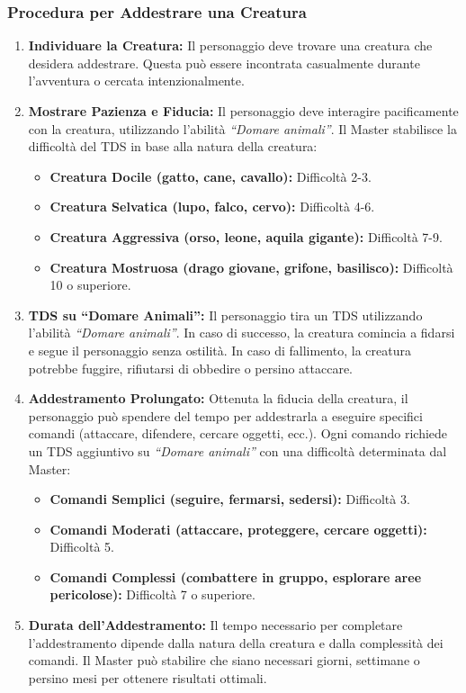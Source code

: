 \documentclass[../manuale_main.tex]{subfiles}
\begin{document}
\subsubsection{Procedura per Addestrare una Creatura}
\begin{enumerate}
    \item \textbf{Individuare la Creatura:} Il personaggio deve trovare una creatura che desidera addestrare. Questa può essere incontrata casualmente durante l'avventura o cercata intenzionalmente.
    
    \item \textbf{Mostrare Pazienza e Fiducia:} Il personaggio deve interagire pacificamente con la creatura, utilizzando l'abilità \emph{``Domare animali''}. Il Master stabilisce la difficoltà del TDS in base alla natura della creatura:
    \begin{itemize}
        \item \textbf{Creatura Docile (gatto, cane, cavallo):} Difficoltà 2-3.
        \item \textbf{Creatura Selvatica (lupo, falco, cervo):} Difficoltà 4-6.
        \item \textbf{Creatura Aggressiva (orso, leone, aquila gigante):} Difficoltà 7-9.
        \item \textbf{Creatura Mostruosa (drago giovane, grifone, basilisco):} Difficoltà 10 o superiore.
    \end{itemize}
    
    \item \textbf{TDS su ``Domare Animali'':} Il personaggio tira un TDS utilizzando l'abilità \emph{``Domare animali''}. In caso di successo, la creatura comincia a fidarsi e segue il personaggio senza ostilità. In caso di fallimento, la creatura potrebbe fuggire, rifiutarsi di obbedire o persino attaccare.
    
    \item \textbf{Addestramento Prolungato:} Ottenuta la fiducia della creatura, il personaggio può spendere del tempo per addestrarla a eseguire specifici comandi (attaccare, difendere, cercare oggetti, ecc.). Ogni comando richiede un TDS aggiuntivo su \emph{``Domare animali''} con una difficoltà determinata dal Master:
    \begin{itemize}
        \item \textbf{Comandi Semplici (seguire, fermarsi, sedersi):} Difficoltà 3.
        \item \textbf{Comandi Moderati (attaccare, proteggere, cercare oggetti):} Difficoltà 5.
        \item \textbf{Comandi Complessi (combattere in gruppo, esplorare aree pericolose):} Difficoltà 7 o superiore.
    \end{itemize}
    
    \item \textbf{Durata dell'Addestramento:} Il tempo necessario per completare l'addestramento dipende dalla natura della creatura e dalla complessità dei comandi. Il Master può stabilire che siano necessari giorni, settimane o persino mesi per ottenere risultati ottimali.
\end{enumerate}
\end{document}

